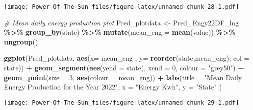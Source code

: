 \documentclass[
]{article}
\newenvironment{Shaded}{\begin{snugshade}}{\end{snugshade}}
\newcommand{\AttributeTok}[1]{\textcolor[rgb]{0.13,0.29,0.53}{#1}}
\newcommand{\CommentTok}[1]{\textcolor[rgb]{0.56,0.35,0.01}{\textit{#1}}}
\newcommand{\DecValTok}[1]{\textcolor[rgb]{0.00,0.00,0.81}{#1}}
\newcommand{\FunctionTok}[1]{\textcolor[rgb]{0.13,0.29,0.53}{\textbf{#1}}}
\newcommand{\NormalTok}[1]{#1}
\newcommand{\OtherTok}[1]{\textcolor[rgb]{0.56,0.35,0.01}{#1}}
\newcommand{\SpecialCharTok}[1]{\textcolor[rgb]{0.81,0.36,0.00}{\textbf{#1}}}
\newcommand{\StringTok}[1]{\textcolor[rgb]{0.31,0.60,0.02}{#1}}
\begin{document}
\texttt{[image: Power-Of-The-Sun\_files/figure-latex/unnamed-chunk-28-1.pdf]}

\begin{Shaded}
\begin{Highlighting}[]
\CommentTok{\# Mean daily energy production plot }
\NormalTok{Pred\_plotdata }\OtherTok{\textless{}{-}}\NormalTok{ Pred\_Engy22DF\_lng }\SpecialCharTok{\%\textgreater{}\%}
  \FunctionTok{group\_by}\NormalTok{(state) }\SpecialCharTok{\%\textgreater{}\%}
  \FunctionTok{mutate}\NormalTok{(}\AttributeTok{mean\_eng =} \FunctionTok{mean}\NormalTok{(value)) }\SpecialCharTok{\%\textgreater{}\%}
  \FunctionTok{ungroup}\NormalTok{()}

\FunctionTok{ggplot}\NormalTok{(Pred\_plotdata, }\FunctionTok{aes}\NormalTok{(}\AttributeTok{x=}\NormalTok{ mean\_eng , }
                          \AttributeTok{y=} \FunctionTok{reorder}\NormalTok{(state,mean\_eng),}
                          \AttributeTok{col =}\NormalTok{ state)) }\SpecialCharTok{+}
  \FunctionTok{geom\_segment}\NormalTok{(}\FunctionTok{aes}\NormalTok{(}\AttributeTok{yend =}\NormalTok{ state), }
               \AttributeTok{xend =} \DecValTok{0}\NormalTok{, }
               \AttributeTok{colour =} \StringTok{"grey50"}\NormalTok{) }\SpecialCharTok{+}
  \FunctionTok{geom\_point}\NormalTok{(}\AttributeTok{size =} \DecValTok{3}\NormalTok{, }
             \FunctionTok{aes}\NormalTok{(}\AttributeTok{colour =}\NormalTok{ mean\_eng)) }\SpecialCharTok{+}
  \FunctionTok{labs}\NormalTok{(}\AttributeTok{title =} \StringTok{"Mean Daily Energy Production for the Year 2022"}\NormalTok{,}
       \AttributeTok{x =} \StringTok{"Energy Kwh"}\NormalTok{, }
       \AttributeTok{y =} \StringTok{"State"}\NormalTok{ ) }
\end{Highlighting}
\end{Shaded}

\texttt{[image: Power-Of-The-Sun\_files/figure-latex/unnamed-chunk-29-1.pdf]}
\end{document}
